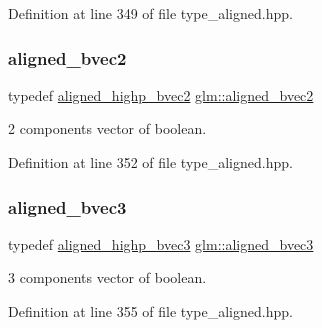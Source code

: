 Definition at line 349 of file type\+\_\+aligned.\+hpp.

\mbox{\label{group__gtc__type__aligned_ga58579cb7fcfb892d0ae1f085327ae2ca}} 
\subsubsection{\texorpdfstring{aligned\_bvec2}{aligned\_bvec2}}
{\footnotesize\ttfamily typedef \mbox{\hyperlink{group__gtc__type__aligned_ga0864e6acd440d07a7eff815da8990467}{aligned\+\_\+highp\+\_\+bvec2}} \mbox{\hyperlink{group__gtc__type__aligned_ga58579cb7fcfb892d0ae1f085327ae2ca}{glm\+::aligned\+\_\+bvec2}}}



2 components vector of boolean. 



Definition at line 352 of file type\+\_\+aligned.\+hpp.

\mbox{\label{group__gtc__type__aligned_ga853a573b554adb2181d9ca23907f8a85}} 
\subsubsection{\texorpdfstring{aligned\_bvec3}{aligned\_bvec3}}
{\footnotesize\ttfamily typedef \mbox{\hyperlink{group__gtc__type__aligned_gadd773554f8ca95a959a269252ad20738}{aligned\+\_\+highp\+\_\+bvec3}} \mbox{\hyperlink{group__gtc__type__aligned_ga853a573b554adb2181d9ca23907f8a85}{glm\+::aligned\+\_\+bvec3}}}



3 components vector of boolean. 



Definition at line 355 of file type\+\_\+aligned.\+hpp.

\mbox{\label{group__gtc__type__aligned_gaa62e46e15c76ced942cdeba89776c5f6}} 
